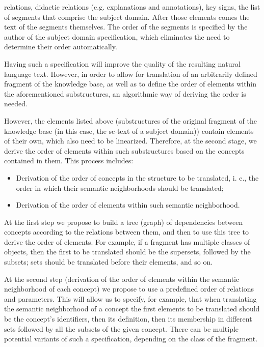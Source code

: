 \documentclass[twocolumn]{scndocument}
\begin{document}
relations, didactic relations (e.g. explanations and annotations), key signs, the list of segments that comprise the
subject domain. After those elements comes the text of
the segments themselves. The order of the segments is
specified by the author of the subject domain specification, which eliminates the need to determine their order
automatically.
\par Having such a specification will improve the quality
of the resulting natural language text. However, in order
to allow for translation of an arbitrarily defined fragment
of the knowledge base, as well as to define the order
of elements within the aforementioned substructures, an
algorithmic way of deriving the order is needed.
\par However, the elements listed above (substructures of
the original fragment of the knowledge base (in this case,
the sc-text of a subject domain)) contain elements of their
own, which also need to be linearized. Therefore, at the
second stage, we derive the order of elements within such
substructures based on the concepts contained in them.
This process includes:
\begin{itemize}
  \item Derivation of the order of concepts in the structure
to be translated, i. e., the order in which their
semantic neighborhoods should be translated;
 \item Derivation of the order of elements within such
semantic neighborhood.
\end{itemize}
\par At the first step we propose to build a tree (graph) of
dependencies between concepts according to the relations
between them, and then to use this tree to derive the order
of elements. For example, if a fragment has multiple
classes of objects, then the first to be translated should
be the supersets, followed by the subsets; sets should be
translated before their elements, and so on.
\par At the second step (derivation of the order of elements
within the semantic neighborhood of each concept) we
propose to use a predefined order of relations and parameters. This will allow us to specify, for example, that
when translating the semantic neighborhood of a concept
the first elements to be translated should be the concept’s
identifiers, then its definition, then its membership in
different sets followed by all the subsets of the given
concept. There can be multiple potential variants of such
a specification, depending on the class of the fragment.
\end{document}
